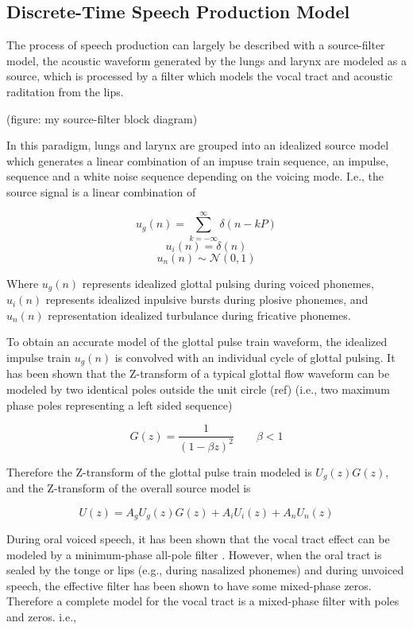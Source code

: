 \subsection{Discrete-Time Speech Production Model}

The process of speech production can largely be described with a source-filter model, the acoustic waveform generated by the lungs and larynx are modeled as a source, which is processed by a filter which models the vocal tract and acoustic raditation from the lips.

(figure: my source-filter block diagram)

In this paradigm, lungs and larynx are grouped into an idealized source model which generates a linear combination of an impuse train sequence, an impulse, sequence and a white noise sequence depending on the voicing mode. I.e., the source signal is a linear combination of

\[ u_g(n)=\sum_{k=-\infty}^{\infty} \delta(n-kP) \]
\[u_i(n)=\delta(n)\]
\[u_n(n)\sim\mathcal{N}(0,1)\]

Where $u_g(n)$ represents idealized glottal pulsing during voiced phonemes, $u_i(n)$ represents idealized inpulsive bursts during plosive phonemes, and $u_n(n)$  representation idealized turbulance during fricative phonemes. 

To obtain an accurate model of the glottal pulse train waveform, the idealized impulse train $u_g(n)$ is convolved with an individual cycle of glottal pulsing. It has been shown that the Z-transform of a typical glottal flow waveform can be modeled by two identical poles outside the unit circle (ref) (i.e., two maximum phase poles representing a left sided sequence)

\begin{equation}
	G(z)=\frac{1}{(1-\beta z)^2} \qquad \beta<1 \label{eq:glottal_pulse_z}
\end{equation}


Therefore the Z-transform of the glottal pulse train modeled is $U_g(z)G(z)$, and the Z-transform of the overall source model is

\[U(z)=A_g U_g(z) G(z)+A_i U_i(z)+A_n U_n(z)\]

During oral voiced speech, it has been shown that the vocal tract effect can be modeled by a minimum-phase all-pole filter \citep{atal1971speech}. However, when the oral tract is sealed by the tonge or lips (e.g., during nasalized phonemes) and during unvoiced speech, the effective filter has been shown to have some mixed-phase zeros. Therefore a complete model for the vocal tract is a mixed-phase filter with poles and zeros. i.e.,

